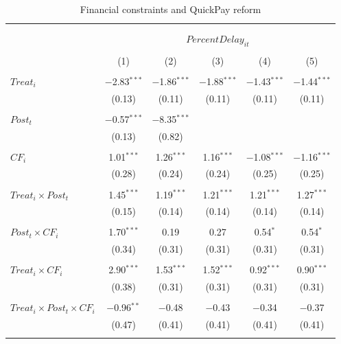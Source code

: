 \documentclass[
]{article}
\begin{document}
\begin{table}[H] \centering 
  \caption{Financial constraints and QuickPay reform} 
  \label{} 
\small 
\begin{tabular}{@{\extracolsep{-2pt}}lccccc} 
\\[-1.8ex]\hline 
\hline \\[-1.8ex] 
\\[-1.8ex] & \multicolumn{5}{c}{$PercentDelay_{it}$  } \\ 
\\[-1.8ex] & (1) & (2) & (3) & (4) & (5)\\ 
\hline \\[-1.8ex] 
 $Treat_i$ & $-$2.83$^{***}$ & $-$1.86$^{***}$ & $-$1.88$^{***}$ & $-$1.43$^{***}$ & $-$1.44$^{***}$ \\ 
  & (0.13) & (0.11) & (0.11) & (0.11) & (0.11) \\ 
  & & & & & \\ 
 $Post_t$ & $-$0.57$^{***}$ & $-$8.35$^{***}$ &  &  &  \\ 
  & (0.13) & (0.82) &  &  &  \\ 
  & & & & & \\ 
 $CF_i$ & 1.01$^{***}$ & 1.26$^{***}$ & 1.16$^{***}$ & $-$1.08$^{***}$ & $-$1.16$^{***}$ \\ 
  & (0.28) & (0.24) & (0.24) & (0.25) & (0.25) \\ 
  & & & & & \\ 
 $Treat_i \times Post_t$ & 1.45$^{***}$ & 1.19$^{***}$ & 1.21$^{***}$ & 1.21$^{***}$ & 1.27$^{***}$ \\ 
  & (0.15) & (0.14) & (0.14) & (0.14) & (0.14) \\ 
  & & & & & \\ 
 $Post_t \times CF_i$ & 1.70$^{***}$ & 0.19 & 0.27 & 0.54$^{*}$ & 0.54$^{*}$ \\ 
  & (0.34) & (0.31) & (0.31) & (0.31) & (0.31) \\ 
  & & & & & \\ 
 $Treat_i \times CF_i$ & 2.90$^{***}$ & 1.53$^{***}$ & 1.52$^{***}$ & 0.92$^{***}$ & 0.90$^{***}$ \\ 
  & (0.38) & (0.31) & (0.31) & (0.31) & (0.31) \\ 
  & & & & & \\ 
 $Treat_i \times Post_t \times CF_i$ & $-$0.96$^{**}$ & $-$0.48 & $-$0.43 & $-$0.34 & $-$0.37 \\ 
  & (0.47) & (0.41) & (0.41) & (0.41) & (0.41) \\ 
  & & & & & \\ 

\end{tabular}
\end{table}
\end{document}
